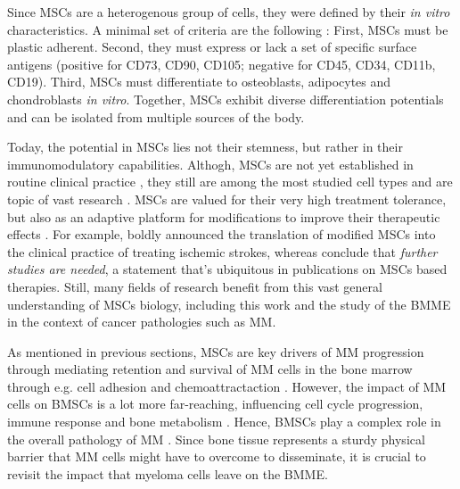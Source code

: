 Since \acp{MSC} are a heterogenous group of cells, they were defined by their
\textit{in vitro} characteristics. A minimal set of criteria are the following
\cite{dominiciMinimalCriteriaDefining2006}: First, \acp{MSC} must be plastic
adherent. Second, they must express or lack a set of specific surface antigens
(positive for CD73, CD90, CD105; negative for CD45, CD34, CD11b, CD19). Third,
\acp{MSC} must differentiate to osteoblasts, adipocytes and chondroblasts
\textit{in vitro}. Together, \acp{MSC} exhibit diverse differentiation
potentials and can be isolated from multiple sources of the body.

Today, the potential in \acp{MSC} lies not their stemness, but rather in their
immunomodulatory capabilities.
Althogh, \acp{MSC} are not yet established in routine clinical practice
, they still are among the most studied cell types and are topic
of vast research \cite{abdelrazikMesenchymalStemCells2023}. \acp{MSC} are valued
for their very high treatment tolerance, but also as an adaptive platform for
modifications to improve their therapeutic effects
\cite{dsouzaMesenchymalStemStromal2015}. For example,
\citet{chenTreatmentIschemicStroke2022} boldly announced the translation of
modified \acp{MSC} into the clinical practice of treating ischemic strokes,
whereas \citet{monivasgallegoMesenchymalStemCell2024} conclude that
\emph{further studies are needed}, a statement that's ubiquitous in publications
on \acp{MSC} based therapies. Still, many fields of research
benefit from this vast general understanding of \acp{MSC} biology, including
this work and the study of the \ac{BMME} in the context of cancer pathologies
such as \ac{MM}.






\label{sec:intro_myeloma_hMSC_interactions}
As mentioned in previous sections, \acp{MSC} are key drivers of \ac{MM}
progression through mediating retention and survival of \ac{MM} cells in the
bone marrow through e.g. cell adhesion and chemoattractaction
\cite{zeissigTumourDisseminationMultiple2020}. However, the impact of \ac{MM}
cells on \acp{BMSC} is a lot more far-reaching, influencing cell cycle
progression, immune response and bone metabolism
\cite{dotterweichContactMyelomaCells2016,
    fernandoTranscriptomeAnalysisMesenchymal2019}. Hence, \acp{BMSC} play a complex
role in the overall pathology of \ac{MM} \cite{mangoliniBoneMarrowStromal2020}.
Since bone tissue represents a sturdy physical barrier that \ac{MM} cells might
have to overcome to disseminate, it is crucial to revisit the impact that
myeloma cells leave on the \ac{BMME}.

